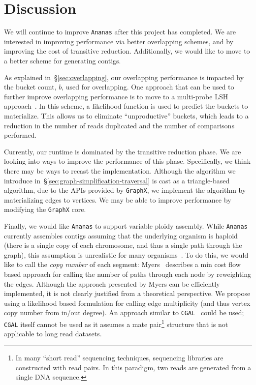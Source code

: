 \documentclass[11pt]{article}
\theoremstyle{plain}
\begin{document}
\section{Discussion}
\label{sec:discussion}

We will continue to improve \texttt{Ananas} after this project has completed. We are interested in
improving performance via better overlapping schemes, and by improving the cost of transitive
reduction. Additionally, we would like to move to a better scheme for generating contigs.

As explained in~\S\ref{sec:overlapping}, our overlapping performance is impacted by the bucket count,
$b$, used for overlapping. One approach that can be used to further improve overlapping performance
is to move to a multi-probe LSH approach~\cite{lv07}. In this scheme, a likelihood function is used
to predict the buckets to materialize. This allows us to eliminate ``unproductive'' buckets, which
leads to a reduction in the number of reads duplicated and the number of comparisons performed.

Currently, our runtime is dominated by the transitive reduction phase. We are looking into ways to
improve the performance of this phase. Specifically, we think there may be ways to recast the
implementation. Although the algorithm we introduce in~\S\ref{sec:graph-simplification-traversal}
is cast as a triangle-based algorithm, due to the APIs provided by \texttt{GraphX}, we implement
the algorithm by materializing edges to vertices. We may be able to improve performance by modifying
the \texttt{GraphX} core.

Finally, we would like \texttt{Ananas} to support variable ploidy assembly. While \texttt{Ananas}
currently assembles contigs assuming that the underlying organism is haploid (there is a single
copy of each chromosome, and thus a single path through the graph), this assumption is unrealistic
for many organisms~\cite{paten14}. To do this, we would like to call the \emph{copy number} of each
segment: Myers~\cite{myers05} describes a min cost flow based approach for calling the number of paths
through each node by reweighting the edges. Although the approach presented by Myers can be efficiently
implemented, it is not clearly justified from a theoretical perspective. We propose using a likelihood
based formulation for calling edge multiplicity (and thus vertex copy number from in/out degree).
An approach similar to \texttt{CGAL}~\cite{rahman13} could be used; \texttt{CGAL} itself cannot be
used as it assumes a mate pair\footnote{In many ``short read'' sequencing techniques, sequencing
libraries are constructed with read pairs. In this paradigm, two reads are generated from a single
DNA sequence.} structure that is not applicable to long read datasets.
\end{document}
